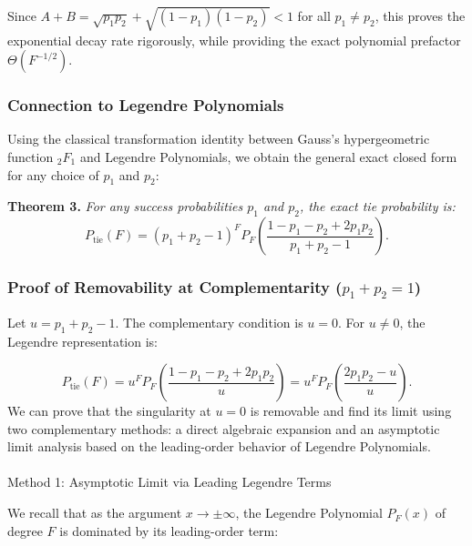 \documentclass[
  letterpaper,
  DIV=11,
  numbers=noendperiod]{scrartcl}
\makeatletter
\let\oldparagraph\paragraph
\renewcommand{\paragraph}{
    \@ifstar
      \xxxParagraphStar
      \xxxParagraphNoStar
  }
\newcommand{\xxxParagraphStar}[1]{\oldparagraph*{#1}\mbox{}}
\newcommand{\xxxParagraphNoStar}[1]{\oldparagraph{#1}\mbox{}}
\makeatother
\begin{document}
Since \(A+B = \sqrt{p_1 p_2} + \sqrt{(1-p_1)(1-p_2)} < 1\) for all
\(p_1 \neq p_2\), this proves the exponential decay rate rigorously,
while providing the exact polynomial prefactor \(\Theta(F^{-1/2})\).

\subsubsection{Connection to Legendre
Polynomials}\label{connection-to-legendre-polynomials}

Using the classical transformation identity between Gauss's
hypergeometric function \(_2F_1\) and Legendre Polynomials, we obtain
the general exact closed form for any choice of \(p_1\) and \(p_2\):

\textbf{Theorem 3.} \emph{For any success probabilities \(p_1\) and
\(p_2\), the exact tie probability is:} \[
P_{\text{tie}}(F) = (p_1 + p_2 - 1)^F P_F\left( \frac{1 - p_1 - p_2 + 2 p_1 p_2}{p_1 + p_2 - 1} \right).
\]

\subsubsection{\texorpdfstring{Proof of Removability at Complementarity
(\(p_1 + p_2 = 1\))}{Proof of Removability at Complementarity (p\_1 + p\_2 = 1)}}\label{proof-of-removability-at-complementarity-p_1-p_2-1}

Let \(u = p_1 + p_2 - 1\). The complementary condition is \(u = 0\). For
\(u \neq 0\), the Legendre representation is:

\[
P_{\text{tie}}(F) = u^F P_F\left( \frac{1 - p_1 - p_2 + 2p_1p_2}{u} \right) = u^F P_F\left( \frac{2p_1p_2 - u}{u} \right).
\] We can prove that the singularity at \(u = 0\) is removable and find
its limit using two complementary methods: a direct algebraic expansion
and an asymptotic limit analysis based on the leading-order behavior of
Legendre Polynomials.

\paragraph{Method 1: Asymptotic Limit via Leading Legendre
Terms}\label{method-1-asymptotic-limit-via-leading-legendre-terms}

We recall that as the argument \(x \to \pm\infty\), the Legendre
Polynomial \(P_F(x)\) of degree \(F\) is dominated by its leading-order
term:
\end{document}
